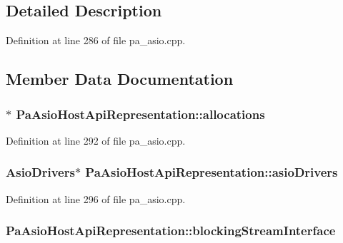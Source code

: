 \subsection{Detailed Description}


Definition at line 286 of file pa\+\_\+asio.\+cpp.



\subsection{Member Data Documentation}
\subsubsection[{\texorpdfstring{allocations}{allocations}}]{$\ast$ Pa\+Asio\+Host\+Api\+Representation\+::allocations}\hypertarget{struct_pa_asio_host_api_representation_aabbb5dbd06d01332baa1d175de3397ed}{}\label{struct_pa_asio_host_api_representation_aabbb5dbd06d01332baa1d175de3397ed}


Definition at line 292 of file pa\+\_\+asio.\+cpp.

\subsubsection[{\texorpdfstring{asio\+Drivers}{asioDrivers}}]{\setlength{\rightskip}{0pt plus 5cm}Asio\+Drivers$\ast$ Pa\+Asio\+Host\+Api\+Representation\+::asio\+Drivers}\hypertarget{struct_pa_asio_host_api_representation_acca033c1828e51de166838ef7ce97936}{}\label{struct_pa_asio_host_api_representation_acca033c1828e51de166838ef7ce97936}


Definition at line 296 of file pa\+\_\+asio.\+cpp.

\subsubsection[{\texorpdfstring{blocking\+Stream\+Interface}{blockingStreamInterface}}]{ Pa\+Asio\+Host\+Api\+Representation\+::blocking\+Stream\+Interface}\hypertarget{struct_pa_asio_host_api_representation_a8cf5e8d03dcc4fc3406c2d3b9d31a4a1}{}\label{struct_pa_asio_host_api_representation_a8cf5e8d03dcc4fc3406c2d3b9d31a4a1}


